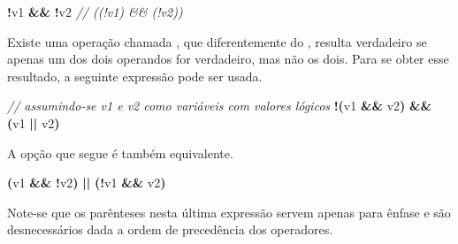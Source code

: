 \documentclass[
  11pt,
  a4paper,
]{scrbook}
\newenvironment{Shaded}{\begin{snugshade}}{\end{snugshade}}
\newcommand{\CommentTok}[1]{\textcolor[rgb]{0.56,0.35,0.01}{\textit{#1}}}
\newcommand{\NormalTok}[1]{#1}
\newcommand{\OperatorTok}[1]{\textcolor[rgb]{0.81,0.36,0.00}{\textbf{#1}}}
\begin{document}
\begin{Shaded}
\begin{Highlighting}[]
\OperatorTok{!}\NormalTok{v1 }\OperatorTok{\&\&} \OperatorTok{!}\NormalTok{v2  }\CommentTok{// ((!v1) \&\& (!v2))}
\end{Highlighting}
\end{Shaded}

\begin{tcolorbox}[enhanced jigsaw, arc=.35mm, bottomtitle=1mm, colbacktitle=quarto-callout-warning-color!10!white, title=\textcolor{quarto-callout-warning-color}{\faExclamationTriangle}\hspace{0.5em}{Curiosidade}, toprule=.15mm, left=2mm, opacityback=0, colback=white, colframe=quarto-callout-warning-color-frame, opacitybacktitle=0.6, bottomrule=.15mm, leftrule=.75mm, toptitle=1mm, coltitle=black, titlerule=0mm, rightrule=.15mm, breakable]

Existe uma operação chamada
{},
que diferentemente do
{}, resulta
verdadeiro se apenas um dos dois operandos for verdadeiro, mas não os
dois. Para se obter esse resultado, a seguinte expressão pode ser usada.

\begin{Shaded}
\begin{Highlighting}[]
\CommentTok{// assumindo{-}se v1 e v2 como variáveis com valores lógicos}
\OperatorTok{!(}\NormalTok{v1 }\OperatorTok{\&\&}\NormalTok{ v2}\OperatorTok{)} \OperatorTok{\&\&} \OperatorTok{(}\NormalTok{v1 }\OperatorTok{||}\NormalTok{ v2}\OperatorTok{)}
\end{Highlighting}
\end{Shaded}

A opção que segue é também equivalente.

\begin{Shaded}
\begin{Highlighting}[]
\OperatorTok{(}\NormalTok{v1 }\OperatorTok{\&\&} \OperatorTok{!}\NormalTok{v2}\OperatorTok{)} \OperatorTok{||} \OperatorTok{(!}\NormalTok{v1 }\OperatorTok{\&\&}\NormalTok{ v2}\OperatorTok{)}
\end{Highlighting}
\end{Shaded}

Note-se que os parênteses nesta última expressão servem apenas para
ênfase e são desnecessários dada a ordem de precedência dos operadores.

\end{tcolorbox}
\end{document}

